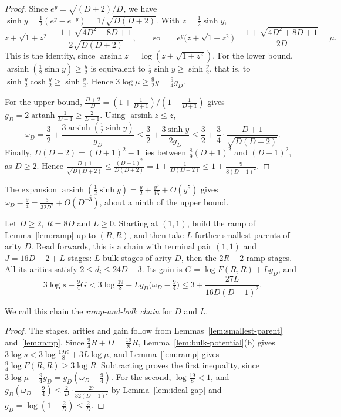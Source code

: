 \begin{proof}
Since \(e^y=\sqrt{(D+2)/D}\), we have
\(\sinh y=\frac12(e^y-e^{-y})=1/\sqrt{D(D+2)}\). With
\(z=\frac12\sinh y\),
\[
 z+\sqrt{1+z^2}=\frac{1+\sqrt{4D^2+8D+1}}{2\sqrt{D(D+2)}},
 \qquad\text{so}\qquad
 e^y\bigl(z+\sqrt{1+z^2}\bigr)=\frac{1+\sqrt{4D^2+8D+1}}{2D}=\mu .
\]
This is the identity, since
\(\operatorname{arsinh}z=\log(z+\sqrt{1+z^2})\). For the lower bound,
\(\operatorname{arsinh}(\frac12\sinh y)\ge\frac y2\) is equivalent to
\(\frac12\sinh y\ge\sinh\frac y2\), that is, to
\(\sinh\frac y2\cosh\frac y2\ge\sinh\frac y2\). Hence
\(3\log\mu\ge\frac92y=\frac94g_D\).

For the upper bound, \(\frac{D+2}D=(1+\frac1{D+1})/(1-\frac1{D+1})\)
gives \(g_D=2\operatorname{artanh}\frac1{D+1}\ge\frac2{D+1}\). Using
\(\operatorname{arsinh}z\le z\),
\[
 \omega_D=\frac32+\frac{3\operatorname{arsinh}(\frac12\sinh y)}{g_D}
 \le\frac32+\frac{3\sinh y}{2g_D}
 \le\frac32+\frac34\cdot\frac{D+1}{\sqrt{D(D+2)}} .
\]
Finally, \(D(D+2)=(D+1)^2-1\) lies between \(\frac89(D+1)^2\) and
\((D+1)^2\), as \(D\ge2\). Hence
\(\frac{D+1}{\sqrt{D(D+2)}}\le\frac{(D+1)^2}{D(D+2)}
=1+\frac1{D(D+2)}\le1+\frac9{8(D+1)^2}\).
\end{proof}

The expansion
\(\operatorname{arsinh}(\frac12\sinh y)=\frac y2+\frac{y^3}{16}+O(y^5)\)
gives \(\omega_D-\frac94=\frac3{32D^2}+O(D^{-3})\), about a ninth of the
upper bound.

\begin{lemma}[Defect]\label{lem:defect}
Let \(D\ge2\), \(R=8D\) and \(L\ge0\). Starting at \((1,1)\), build
the ramp of Lemma~\ref{lem:ramp} up to \((R,R)\), and then take \(L\)
further smallest parents of arity \(D\). Read forwards, this is a chain
with terminal pair \((1,1)\) and \(J=16D-2+L\) stages: \(L\) bulk
stages of arity \(D\), then the \(2R-2\) ramp stages. All its arities
satisfy \(2\le d_i\le24D-3\). Its gain is \(G=\log F(R,R)+Lg_D\), and
\begin{equation}\label{eq:defect}
 3\log s-\tfrac94G<3\log\tfrac{19}8+Lg_D\bigl(\omega_D-\tfrac94\bigr)
 \le3+\frac{27L}{16D(D+1)^2}.
\end{equation}
\end{lemma}

We call this chain the \emph{ramp-and-bulk chain} for \(D\) and \(L\).

\begin{proof}
The stages, arities and gain follow from
Lemmas~\ref{lem:smallest-parent} and~\ref{lem:ramp}. Since
\(\frac94R+D=\frac{19}8R\), Lemma~\ref{lem:bulk-potential}(b) gives
\(3\log s<3\log\frac{19R}8+3L\log\mu\), and Lemma~\ref{lem:ramp} gives
\(\frac94\log F(R,R)\ge3\log R\). Subtracting proves the first
inequality, since \(3\log\mu-\frac94g_D=g_D(\omega_D-\frac94)\). For the
second, \(\log\frac{19}8<1\), and
\(g_D(\omega_D-\frac94)\le\frac2D\cdot\frac{27}{32(D+1)^2}\) by
Lemma~\ref{lem:ideal-gap} and \(g_D=\log(1+\frac2D)\le\frac2D\).
\end{proof}

